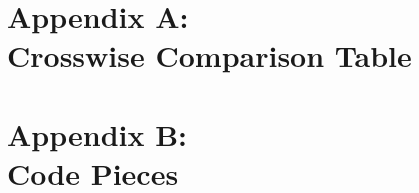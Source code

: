 \documentclass{kthesis}
\begin{document}

\frontmatter
\maketitle
\clearpage
\clearpage

\setcounter{tocdepth}{2} %
\renewcommand{\contentsname}{Contents} %
\tableofcontents
\clearpage

\listoffigures
\clearpage
\listoftables

\lstlistoflistings

\mainmatter
\setcounter{secnumdepth}{3} %







\backmatter %
\begin{appendices}
\chapter{Appendix A: \\Crosswise Comparison Table}
\label{app:A}

\chapter{Appendix B:\\Code Pieces}
\label{app:B}

\end{appendices}

\appendix
\end{document}
